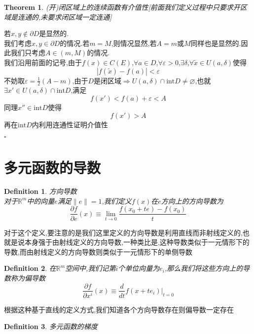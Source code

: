 \documentclass[11pt,hyperref,a4paper,UTF8]{ctexart}
\newtheorem{theorem}{Theorem}[subsection]
\newtheorem{definition}{Definition}[subsection]
\newenvironment{cproof}{%
\heiti{证明}\kaishu
}{%
  \hfill $\square$
  \par\bigskip
}
\newcommand{\RR}{\mathbb{R}}
\begin{document}
\begin{CJK}{UTF8}{gkai}
\begin{theorem}
  (开)闭区域上的连续函数有介值性[前面我们定义过程中只要求开区域是连通的,未要求闭区域一定连通]
\end{theorem}

\begin{cproof}
  若$x,y \notin \partial D$是显然的.\\

  我们考虑$x,y \in \partial D$的情况.若$m = M$,则情况显然,若$A = m$或$M$同样也是显然的.因此我们只考虑$A \in (m,M)$的情况.\\

  我们沿用前面的记号,由于$f(x)\in C(E)$,$\forall a \in D$,$\forall \varepsilon > 0$,$\exists \delta$,$\forall \tilde{x}\in U(a,\delta)$使得
  \[|f(\tilde{x}) - f(a)| < \varepsilon \]
  不妨取$\varepsilon = \frac{1}{2}(A - m)$,由于$D$是闭区域$\Rightarrow U(a,\delta) \cap \text{int} D \neq \varnothing$,也就$\exists x' \in U(a,\delta) \cap \text{int} D$,满足
  \[f(x') < f(a) + \varepsilon < A\]
  同理$x'' \in \text{int} D$使得
  \[f(x') > A\]
  再在$\text{int} D$内利用连通性证明介值性

\end{cproof}

\section{多元函数的导数}
\begin{definition}
  方向导数\\

  对于$\RR^m$中的向量$e$满足$\|e\| = 1$,我们定义$f(x)$在$e$方向上的方向导数为
  \[\frac{\partial f}{\partial e}(x) \equiv \lim_{t\to 0} \frac{f(x_0 + te) - f(x_0)}{t}\]
  
\end{definition}
对于这个定义,要注意的是我们这里定义的方向导数是利用直线而非射线定义的,也就是说本身强于由射线定义的方向导数,一种类比是,这种导数类似于一元情形下的导数,而由射线定义的方向导数则类似于一元情形下的单侧导数

\begin{definition}
  在$\RR^m$空间中,我们记第$i$个单位向量为$e_i$,那么我们将这些方向上的导数称为偏导数
  \[\frac{\partial f}{\partial x^i}(x) \equiv \frac{d}{dt}f(x + t e_i)|_{t = 0}\]
\end{definition}

根据这种基于直线的定义方式,我们知道各个方向导数存在则偏导数一定存在

\begin{definition}
  多元函数的梯度


\end{definition}
\end{CJK}
\end{document}

